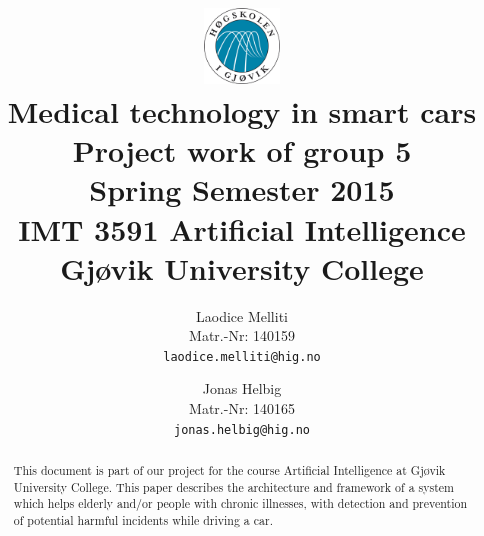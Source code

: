 \documentclass[a4paper]{article}		%
\title{									%
	\includegraphics[height=2cm]{images/higlogo}\\\vspace{1cm}	%
	Medical technology in smart cars\\\vspace{7mm}
	\Large{Project work of group 5}\\\vspace{5mm}			%
	\normalsize{Spring Semester 2015}\\\vspace{1cm}			
	\large{IMT 3591 Artificial Intelligence\\
		Gj\o{}vik University College
		\\\vspace{1cm}}}
\author{			%
Laodice Melliti\\
Matr.-Nr: 140159\\
{\tt laodice.melliti@hig.no}
\and 
Jonas Helbig\\
Matr.-Nr: 140165\\
{\tt jonas.helbig@hig.no}
\vspace{1cm}}
\begin{document}
	
\maketitle				%
\thispagestyle{empty} 	%
\begin{abstract}		%
	This document is part of our project for the course Artificial Intelligence at Gj\o{}vik University College. This paper describes the architecture and framework of a system which helps elderly and/or people with chronic illnesses, with detection and prevention of potential harmful incidents while driving a car. 
\end{abstract}

\newpage				%
\tableofcontents		%
\newpage



\newpage	%
\newpage

\listoffigures
\listofalgorithms
\end{document}
